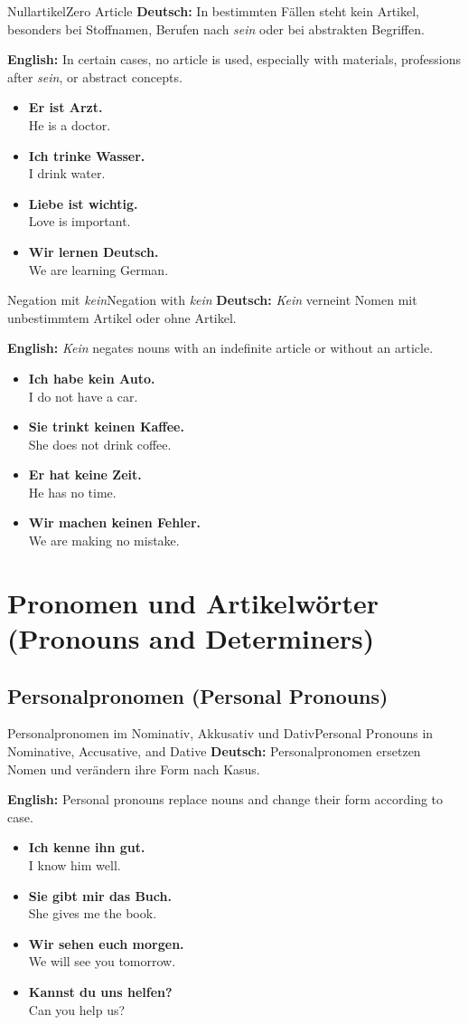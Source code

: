 \documentclass[a4paper,11pt]{article}
\newcommand{\GermanText}[1]{\textbf{Deutsch: }#1\par}
\newcommand{\EnglishText}[1]{{\color{SoftGray}\textbf{English: }#1\par}}
\newcommand{\ExampleItem}[2]{\item \textbf{#1}\\{\color{SoftGray}#2}}
\begin{document}
\begin{grammarentry}{Nullartikel}{Zero Article}
    \GermanText{In bestimmten Fällen steht kein Artikel, besonders bei Stoffnamen, Berufen nach \textit{sein} oder bei abstrakten Begriffen.}
    \EnglishText{In certain cases, no article is used, especially with materials, professions after \textit{sein}, or abstract concepts.}
    \begin{exbox}
        \begin{itemize}
            \ExampleItem{Er ist Arzt.}{He is a doctor.}
            \ExampleItem{Ich trinke Wasser.}{I drink water.}
            \ExampleItem{Liebe ist wichtig.}{Love is important.}
            \ExampleItem{Wir lernen Deutsch.}{We are learning German.}
        \end{itemize}
    \end{exbox}
\end{grammarentry}

\begin{grammarentry}{Negation mit \textit{kein}}{Negation with \textit{kein}}
    \GermanText{\textit{Kein} verneint Nomen mit unbestimmtem Artikel oder ohne Artikel.}
    \EnglishText{\textit{Kein} negates nouns with an indefinite article or without an article.}
    \begin{exbox}
        \begin{itemize}
            \ExampleItem{Ich habe kein Auto.}{I do not have a car.}
            \ExampleItem{Sie trinkt keinen Kaffee.}{She does not drink coffee.}
            \ExampleItem{Er hat keine Zeit.}{He has no time.}
            \ExampleItem{Wir machen keinen Fehler.}{We are making no mistake.}
        \end{itemize}
    \end{exbox}
\end{grammarentry}

\section{Pronomen und Artikelwörter {\small (Pronouns and Determiners)}}

\subsection{Personalpronomen {\small (Personal Pronouns)}}

\begin{grammarentry}{Personalpronomen im Nominativ, Akkusativ und Dativ}{Personal Pronouns in Nominative, Accusative, and Dative}
    \GermanText{Personalpronomen ersetzen Nomen und verändern ihre Form nach Kasus.}
    \EnglishText{Personal pronouns replace nouns and change their form according to case.}
    \begin{exbox}
        \begin{itemize}
            \ExampleItem{Ich kenne ihn gut.}{I know him well.}
            \ExampleItem{Sie gibt mir das Buch.}{She gives me the book.}
            \ExampleItem{Wir sehen euch morgen.}{We will see you tomorrow.}
            \ExampleItem{Kannst du uns helfen?}{Can you help us?}
        \end{itemize}
    \end{exbox}
\end{grammarentry}
\end{document}
